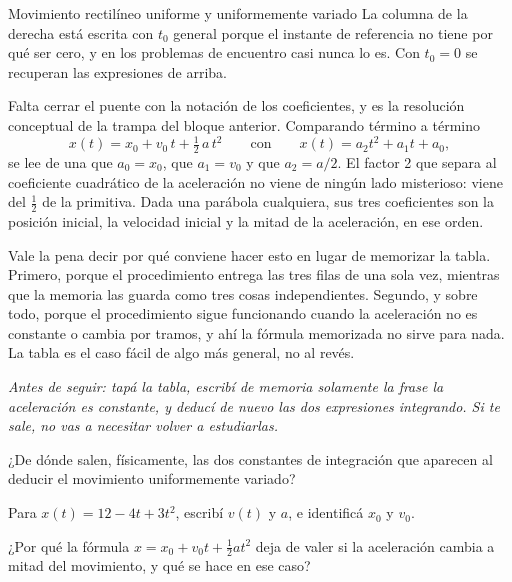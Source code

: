 \documentclass[11pt,openany]{book}
\begin{document}
\begin{bloque}{Movimiento rectilíneo uniforme y uniformemente variado}
La columna de la derecha está escrita con $t_0$ general porque el instante de referencia no tiene por qué ser cero, y en los problemas de encuentro casi nunca lo es. Con $t_0=0$ se recuperan las expresiones de arriba.

Falta cerrar el puente con la notación de los coeficientes, y es la resolución conceptual de la trampa del bloque anterior. Comparando término a término
\[
x(t) = x_0 + v_0\,t + \tfrac12\,a\,t^2 \qquad\text{con}\qquad x(t) = a_2t^2 + a_1t + a_0,
\]
se lee de una que $a_0 = x_0$, que $a_1 = v_0$ y que $a_2 = a/2$. El factor 2 que separa al coeficiente cuadrático de la aceleración no viene de ningún lado misterioso: viene del $\tfrac12$ de la primitiva. Dada una parábola cualquiera, sus tres coeficientes son la posición inicial, la velocidad inicial y la mitad de la aceleración, en ese orden.

Vale la pena decir por qué conviene hacer esto en lugar de memorizar la tabla. Primero, porque el procedimiento entrega las tres filas de una sola vez, mientras que la memoria las guarda como tres cosas independientes. Segundo, y sobre todo, porque el procedimiento sigue funcionando cuando la aceleración no es constante o cambia por tramos, y ahí la fórmula memorizada no sirve para nada. La tabla es el caso fácil de algo más general, no al revés.

\textit{Antes de seguir: tapá la tabla, escribí de memoria solamente la frase la aceleración es constante, y deducí de nuevo las dos expresiones integrando. Si te sale, no vas a necesitar volver a estudiarlas.}
\end{bloque}

\begin{chequeo}
\item ¿De dónde salen, físicamente, las dos constantes de integración que aparecen al deducir el movimiento uniformemente variado?
\item Para $x(t) = 12 - 4t + 3t^2$, escribí $v(t)$ y $a$, e identificá $x_0$ y $v_0$.
\item ¿Por qué la fórmula $x = x_0 + v_0t + \tfrac12 at^2$ deja de valer si la aceleración cambia a mitad del movimiento, y qué se hace en ese caso?
\end{chequeo}
\end{document}
